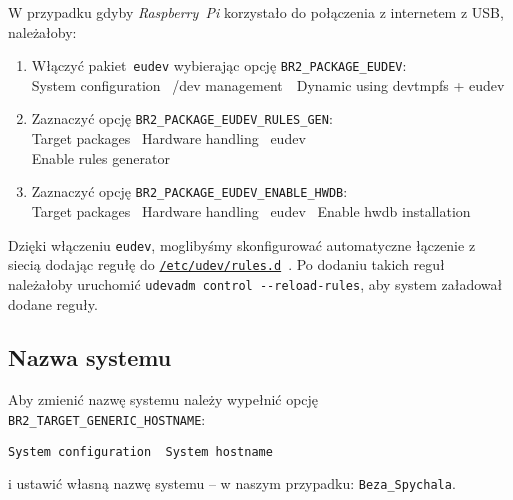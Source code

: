 \documentclass{article}
\newenvironment{ttblock}{\ttfamily}{\par}
\begin{document}
\noindent W przypadku gdyby \emph{Raspberry~Pi} korzystało do połączenia z internetem z USB, należałoby:
\begin{enumerate}
\item Włączyć pakiet~\texttt{eudev} wybierając opcję \texttt{BR2\_PACKAGE\_EUDEV}:\\
\begin{ttblock}
System configuration \textrightarrow\ /dev management\ \textrightarrow\ Dynamic using devtmpfs + eudev
\end{ttblock}

\item Zaznaczyć opcję \texttt{BR2\_PACKAGE\_EUDEV\_RULES\_GEN}:\\
\begin{ttblock}
Target packages \textrightarrow\ Hardware handling \textrightarrow\ eudev \textrightarrow\\Enable rules generator
\end{ttblock}

\item Zaznaczyć opcję \texttt{BR2\_PACKAGE\_EUDEV\_ENABLE\_HWDB}:\\
\begin{ttblock}
Target packages \textrightarrow\ Hardware handling \textrightarrow\ eudev \textrightarrow\ Enable hwdb installation
\end{ttblock}
\end{enumerate}

\noindent Dzięki włączeniu \texttt{eudev}, moglibyśmy skonfigurować automatyczne łączenie z siecią dodając regułę do \href{http://www.reactivated.net/writing_udev_rules.html}{\texttt{/etc/udev/rules.d}}~\cite{www:arch-udev}. Po dodaniu takich reguł należałoby uruchomić \texttt{udevadm control -{}-reload-rules}, aby system załadował dodane reguły.


\subsection{Nazwa systemu}

Aby zmienić nazwę systemu należy wypełnić opcję \texttt{ BR2\_TARGET\_GENERIC\_HOSTNAME}:

\begin{center}
\texttt{System configuration \textrightarrow\ System hostname}
\end{center}

\noindent i ustawić własną nazwę systemu -- w naszym przypadku: \texttt{Beza\_Spychala}.
\end{document}

